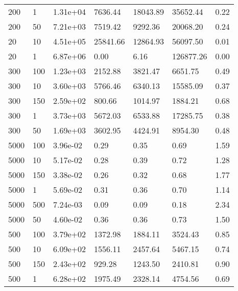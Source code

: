 \begin{table}
\begin{tabular}{lllllll}
200       &   1         &   1.31e+04  &   7636.44   &   18043.89  &   35652.44  &   0.22      \\ 
200       &   50        &   7.21e+03  &   7519.42   &   9292.36   &   20068.20  &   0.24      \\ 
20        &   10        &   4.51e+05  &   25841.66  &   12864.93  &   56097.50  &   0.01      \\ 
20        &   1         &   6.87e+06  &   0.00      &   6.16      &   126877.26 &   0.00      \\ 
300       &   100       &   1.23e+03  &   2152.88   &   3821.47   &   6651.75   &   0.49      \\ 
300       &   10        &   3.60e+03  &   5766.46   &   6340.13   &   15585.09  &   0.37      \\ 
300       &   150       &   2.59e+02  &   800.66    &   1014.97   &   1884.21   &   0.68      \\ 
300       &   1         &   3.73e+03  &   5672.03   &   6533.88   &   17285.75  &   0.38      \\ 
300       &   50        &   1.69e+03  &   3602.95   &   4424.91   &   8954.30   &   0.48      \\ 
5000      &   100       &   3.96e-02  &   0.29      &   0.35      &   0.69      &   1.59      \\ 
5000      &   10        &   5.17e-02  &   0.28      &   0.39      &   0.72      &   1.28      \\ 
5000      &   150       &   3.38e-02  &   0.26      &   0.32      &   0.68      &   1.77      \\ 
5000      &   1         &   5.69e-02  &   0.31      &   0.36      &   0.70      &   1.14      \\ 
5000      &   500       &   7.24e-03  &   0.09      &   0.09      &   0.18      &   2.34      \\ 
5000      &   50        &   4.60e-02  &   0.36      &   0.36      &   0.73      &   1.50      \\ 
500       &   100       &   3.79e+02  &   1372.98   &   1884.11   &   3524.43   &   0.85      \\ 
500       &   10        &   6.09e+02  &   1556.11   &   2457.64   &   5467.15   &   0.74      \\ 
500       &   150       &   2.43e+02  &   929.28    &   1243.50   &   2410.81   &   0.90      \\ 
500       &   1         &   6.28e+02  &   1975.49   &   2328.14   &   4754.56   &   0.69      \\ 

\end{tabular}
\end{table}
